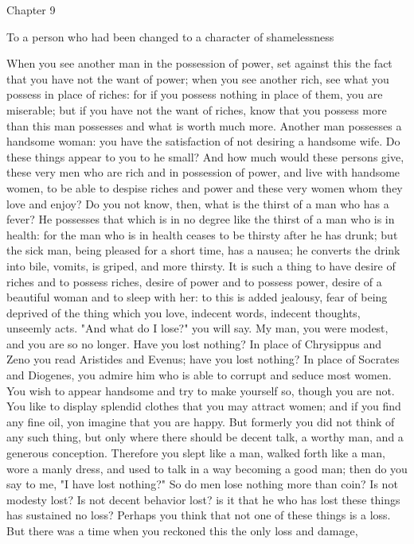 \documentclass[a4paper]{article}
\begin{document}
Chapter 9

To a person who had been changed to a character of shamelessness

    When you see another man in the possession of power, set against this the
fact that you have not the want of power; when you see another rich, see what
you possess in place of riches: for if you possess nothing in place of them,
you are miserable; but if you have not the want of riches, know that you
possess more than this man possesses and what is worth much more. Another man
possesses a handsome woman: you have the satisfaction of not desiring a
handsome wife. Do these things appear to you to he small? And how much would
these persons give, these very men who are rich and in possession of power, and
live with handsome women, to be able to despise riches and power and these very
women whom they love and enjoy? Do you not know, then, what is the thirst of a
man who has a fever? He possesses that which is in no degree like the thirst of
a man who is in health: for the man who is in health ceases to be thirsty after
he has drunk; but the sick man, being pleased for a short time, has a nausea;
he converts the drink into bile, vomits, is griped, and more thirsty. It is
such a thing to have desire of riches and to possess riches, desire of power
and to possess power, desire of a beautiful woman and to sleep with her: to
this is added jealousy, fear of being deprived of the thing which you love,
indecent words, indecent thoughts, unseemly acts.
    "And what do I lose?" you will say. My man, you were modest, and you are so
no longer. Have you lost nothing? In place of Chrysippus and Zeno you read
Aristides and Evenus; have you lost nothing? In place of Socrates and Diogenes,
you admire him who is able to corrupt and seduce most women. You wish to appear
handsome and try to make yourself so, though you are not. You like to display
splendid clothes that you may attract women; and if you find any fine oil, yon
imagine that you are happy. But formerly you did not think of any such thing,
but only where there should be decent talk, a worthy man, and a generous
conception. Therefore you slept like a man, walked forth like a man, wore a
manly dress, and used to talk in a way becoming a good man; then do you say to
me, "I have lost nothing?" So do men lose nothing more than coin? Is not
modesty lost? Is not decent behavior lost? is it that he who has lost these
things has sustained no loss? Perhaps you think that not one of these things is
a loss. But there was a time when you reckoned this the only loss and damage,
\end{document}
